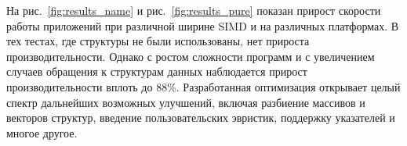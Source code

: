 На рис.~\ref{fig:results_name} и рис.~\ref{fig:results_pure} показан прирост скорости работы приложений при различной ширине SIMD и на различных платформах.
В тех тестах, где структуры не были использованы, нет прироста производительности.
Однако с ростом сложности программ и с увеличением случаев обращения к структурам данных наблюдается прирост производительности вплоть до 88\%.
Разработанная оптимизация открывает целый спектр дальнейших возможных улучшений, включая разбиение массивов и векторов структур, введение пользовательских эвристик, поддержку указателей и многое другое.